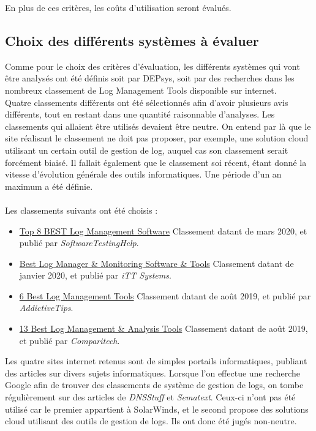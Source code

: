 \documentclass[paper=a4, fontsize=11pt]{scrartcl}
\begin{document}
En plus de ces critères, les coûts d'utilisation seront évalués.\\

\subsection{Choix des différents systèmes à évaluer}

Comme pour le choix des critères d'évaluation, les différents systèmes qui vont être analysés ont été définis soit par DEPsys, soit par des recherches dans les nombreux classement de \og Log Management Tools \fg disponible sur internet.\\
Quatre classements différents ont été sélectionnés afin d'avoir plusieurs avis différents, tout en restant dans une quantité raisonnable d'analyses. Les classements qui allaient être utilisés devaient être neutre. On entend par là que le site réalisant le classement ne doit pas proposer, par exemple, une solution cloud utilisant un certain outil de gestion de log, auquel cas son classement serait forcément biaisé. Il fallait également que le classement soi récent, étant donné la vitesse d'évolution générale des outils informatiques. Une période d'un an maximum a été définie.\\\\
Les classements suivants ont été choisis :
\begin{itemize}
    \item \href{https://www.softwaretestinghelp.com/log-management-software/}{Top 8 BEST Log Management Software}
    \subitem Classement datant de mars 2020, et publié par \textit{SoftwareTestingHelp}.
    \item \href{https://www.ittsystems.com/log-manager-software-and-tools/}{Best Log Manager \& Monitoring Software \& Tools}
    \subitem Classement datant de janvier 2020, et publié par \textit{iTT Systems}.
    \item \href{https://www.addictivetips.com/net-admin/linux-log-management-tools/}{6 Best Log Management Tools}
    \subitem Classement datant de août 2019, et publié par \textit{AddictiveTips}.
    \item \href{https://www.comparitech.com/net-admin/log-management-tools/}{13 Best Log Management \& Analysis Tools}
    \subitem Classement datant de août 2019, et publié par \textit{Comparitech}.
\end{itemize}

Les quatre sites internet retenus sont de simples portails informatiques, publiant des articles sur divers sujets informatiques. Lorsque l'on effectue une recherche Google afin de trouver des classements de système de gestion de logs, on tombe régulièrement sur des articles de \textit{DNSStuff} et \textit{Sematext}. Ceux-ci n'ont pas été utilisé car le premier appartient à SolarWinds, et le second propose des solutions cloud utilisant des outils de gestion de logs. Ils ont donc été jugés non-neutre.
\end{document}
